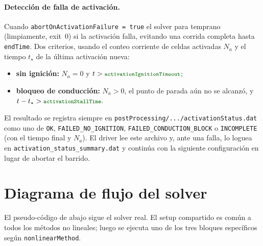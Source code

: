 \documentclass[11pt,a4paper]{article}
\newcommand{\code}[1]{\texttt{\small #1}}
\newcommand{\dictkey}[1]{\textcolor{black!60!green}{\texttt{\footnotesize #1}}}
\begin{document}
\paragraph{Detección de falla de activación.}
Cuando \dictkey{abortOnActivationFailure = true} el solver para temprano
(limpiamente, exit~0) si la activación falla, evitando una corrida completa hasta
\code{endTime}. Dos criterios, usando el conteo corriente de celdas activadas $N_a$
y el tiempo $t_\star$ de la última activación nueva:
\begin{itemize}[topsep=2pt,itemsep=1pt]
  \item \textbf{sin ignición:} $N_a=0$ y
        $t>\dictkey{activationIgnitionTimeout}$;
  \item \textbf{bloqueo de conducción:} $N_a>0$, el punto de parada aún no se
        alcanzó, y $t-t_\star>\dictkey{activationStallTime}$.
\end{itemize}
El resultado se registra siempre en
\code{postProcessing/.../activationStatus.dat} como uno de \code{OK},
\code{FAILED\_NO\_IGNITION}, \code{FAILED\_CONDUCTION\_BLOCK} o \code{INCOMPLETE}
(con el tiempo final y $N_a$). El driver lee este archivo y, ante una falla, lo
loguea en \code{activation\_status\_summary.dat} y continúa con la siguiente
configuración en lugar de abortar el barrido.

\section{Diagrama de flujo del solver}

El pseudo-código de abajo sigue el solver real. El setup compartido es común a todos
los métodos no lineales; luego se ejecuta uno de los tres bloques específicos según
\dictkey{nonlinearMethod}.
\end{document}

